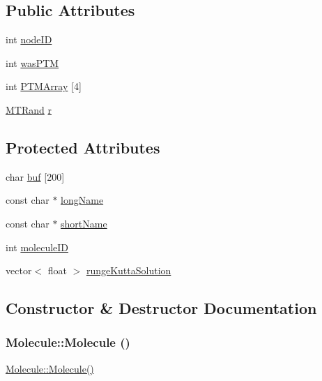 \subsection*{Public Attributes}
\begin{DoxyCompactItemize}
\item 
int \hyperlink{classMolecule_a4eafa2831869e116f64c86987f1cac81}{nodeID}
\item 
int \hyperlink{classMolecule_a134dd5ffa71953792912c7b0cca01405}{wasPTM}
\item 
int \hyperlink{classMolecule_ae6aff39305dd77531ea5a213b6f2b1c5}{PTMArray} \mbox{[}4\mbox{]}
\item 
\hyperlink{classMTRand}{MTRand} \hyperlink{classMolecule_af036bbaa1f3ec537d3711ae3242d3074}{r}
\end{DoxyCompactItemize}
\subsection*{Protected Attributes}
\begin{DoxyCompactItemize}
\item 
char \hyperlink{classMolecule_a5b6f24dea7138830541e938e2eed707a}{buf} \mbox{[}200\mbox{]}
\item 
const char $\ast$ \hyperlink{classMolecule_a4ac09eefeba07dcb455014acc1ad00c9}{longName}
\item 
const char $\ast$ \hyperlink{classMolecule_ae79f60ef35ffcb500e91013f59563e03}{shortName}
\item 
int \hyperlink{classMolecule_a563a9a295191833b51660f77749e3628}{moleculeID}
\item 
vector$<$ float $>$ \hyperlink{classMolecule_a3e3be6cd7b1286e8d8d489642ab19641}{rungeKuttaSolution}
\end{DoxyCompactItemize}


\subsection{Constructor \& Destructor Documentation}
\hypertarget{classMolecule_a7e7d290ae641518ad4c4d5303b519d0f}{
\subsubsection[{Molecule}]{\setlength{\rightskip}{0pt plus 5cm}Molecule::Molecule ()}}
\label{classMolecule_a7e7d290ae641518ad4c4d5303b519d0f}
\hyperlink{classMolecule_a7e7d290ae641518ad4c4d5303b519d0f}{Molecule::Molecule()}

